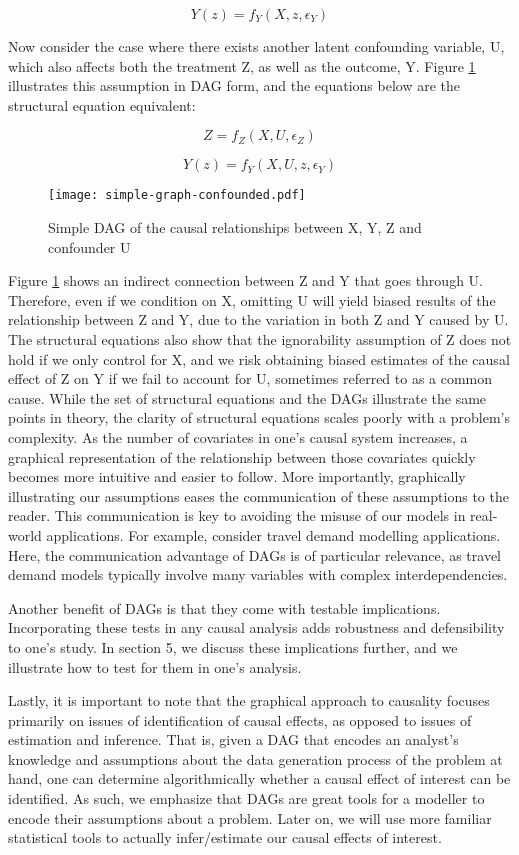 \[Y(z) = f_Y(X, z, \epsilon_Y)  \]

Now consider the case where there exists another latent confounding variable, U, which also affects both the treatment Z, as well as the outcome, Y.
Figure \ref{fig:simple-graph-confounded} illustrates this assumption in DAG form, and the equations below are the structural equation equivalent:

\[Z = f_Z(X, U, \epsilon_Z)  \]

\[Y(z) = f_Y(X, U, z, \epsilon_Y)  \]

\begin{figure}[h!]
   \centering
   \texttt{[image: simple-graph-confounded.pdf]}
   \caption{Simple DAG of the causal relationships between X, Y, Z and confounder U}
   \label{fig:simple-graph-confounded}
\end{figure}

Figure \ref{fig:simple-graph-confounded} shows an indirect connection between Z and Y that goes through U.
Therefore, even if we condition on X, omitting U will yield biased results of the relationship between Z and Y, due to the variation in both Z and Y caused by U.
The structural equations also show that the ignorability assumption of Z does not hold if we only control for X, and we risk obtaining biased estimates of the causal effect of Z on Y if we fail to account for U, sometimes referred to as a common cause.
While the set of structural equations and the DAGs illustrate the same points in theory, the clarity of structural equations scales poorly with a problem's complexity.
As the number of covariates in one's causal system increases, a graphical representation of the relationship between those covariates quickly becomes more intuitive and easier to follow.
More importantly, graphically illustrating our assumptions eases the communication of these assumptions to the reader.
This communication is key to avoiding the misuse of our models in real-world applications.
For example, consider travel demand modelling applications.
Here, the communication advantage of DAGs is of particular relevance, as travel demand models typically involve many variables with complex interdependencies.

Another benefit of DAGs is that they come with testable implications.
Incorporating these tests in any causal analysis adds robustness and defensibility to one's study.
In section 5, we discuss these implications further, and we illustrate how to test for them in one's analysis.

Lastly, it is important to note that the graphical approach to causality focuses
primarily on issues of identification of causal effects, as opposed to issues of estimation and inference. That is, given a
DAG that encodes an analyst's knowledge and assumptions about the data generation process of the problem at hand, one can determine algorithmically whether a causal effect of interest can be identified.
As such, we emphasize that DAGs are great tools
for a modeller to encode their assumptions about a problem.
Later on, we will use more familiar statistical tools to actually infer/estimate our causal effects of interest.

